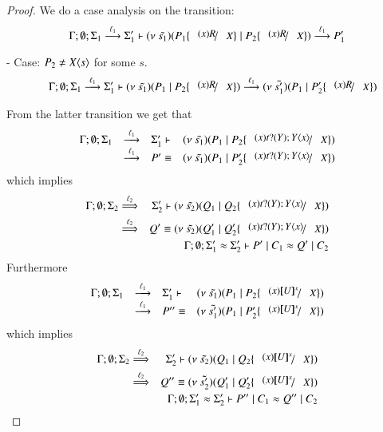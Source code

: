 \begin{proof}
	\noi We do a case analysis on the transition:
%
	\[
		\Gamma; \es; \Sigma_1 \by{\ell_1} \Sigma_1' \proves \newsp{\tilde{s_1}}{P_1 \subst{(x) R}{X} \Par P_2\subst{(x) R}{X} } \by{\ell_1} P_1'
	\]
%

	\noi - Case: $P_2 \not= X\langle s \rangle$ for some $s$.
%
	\begin{eqnarray*}
		&&\Gamma; \es; \Sigma_1 \by{\ell_1} \Sigma_1' \proves \newsp{\tilde{s_1}}{P_1 \Par P_2 \subst{(x) R}{X} }
		\by{\ell_1}
		\newsp{\tilde{s_1'}}{P_1 \Par P_2' \subst{(x) R}{X}}
	\end{eqnarray*}

	\noi From the latter transition we get that
%
\[
	\begin{array}{rcll}
		\Gamma; \es; \Sigma_1 &\by{\ell_1}& \Sigma_1' \proves & \newsp{\tilde{s_1}}{P_1 \Par P_2 \subst{(x) \binp{t}{Y} \appl{Y}{x}}{X}}\\
		&\by{\ell_1}&
		P' \scong & \newsp{\tilde{s_1}}{P_1 \Par P_2' \subst{(x) \binp{t}{Y} \appl{Y}{x}}{X}}
	\end{array}
\]
%
	\noi which implies
%
	\begin{eqnarray}
		\Gamma; \es; \Sigma_2 &\By{\ell_2}& \Sigma_2' \proves \newsp{\tilde{s_2}}{Q_1 \Par Q_2 \subst{(x) \binp{t}{Y} \appl{Y}{x}}{X}} \\
		&\By{\ell_2}&
		Q' \scong \newsp{\tilde{s_2}}{Q_1' \Par Q_2' \subst{(x) \binp{t}{Y} \appl{Y}{x}}{X}} \label{lem:subst_equiv1}
		\\
		&&\Gamma; \es; \Sigma_1' \wb \Sigma_2' \proves P' \Par C_1 \wb Q' \Par C_2 \label{lem:subst_equiv2}
	\end{eqnarray}
%
	\noi Furthermore
%
\[
	\begin{array}{rcll}
		\Gamma; \es; \Sigma_1 &\by{\ell_1}& \Sigma_1' \proves & \newsp{\tilde{s_1}}{P_1 \Par P_2 \subst{(x) \map{U}^x}{X}}\\
		&\by{\ell_1}&
		P'' \scong & \newsp{\tilde{s_1'}}{P_1 \Par P_2' \subst{(x) \map{U}^x}{X}}
	\end{array}
\]
%
	\noi which implies
%
	\begin{eqnarray}
		\Gamma; \es; \Sigma_2 &\By{\ell_2}& \Sigma_2' \proves \newsp{\tilde{s_2}}{Q_1 \Par Q_2 \subst{(x) \map{U}^x}{X}} \\
		&\By{\ell_2}& Q'' \scong \newsp{\tilde{s_2'}}{Q_1' \Par Q_2' \subst{(x) \map{U}^x}{X}} \label{lem:subst_equiv3}
		\\
		&&\Gamma; \es; \Sigma_1' \wb \Sigma_2' \proves P'' \Par C_1 \wb Q'' \Par C_2 \label{lem:subst_equiv4}

\end{eqnarray}
\end{proof}
